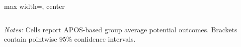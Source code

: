 \begin{landscape}
\begin{table}[p]
\begin{adjustbox}{max width=\linewidth, center}
\begin{tabular}{lccccccccccccccccccccccccc}
\bottomrule
\end{tabular}
\end{adjustbox}
\par\vspace{3pt}
\begin{minipage}{\linewidth}\footnotesize \textit{Notes:} Cells report APOS-based group average potential outcomes. Brackets contain pointwise 95\% confidence intervals.\end{minipage}
\end{table}
\end{landscape}
